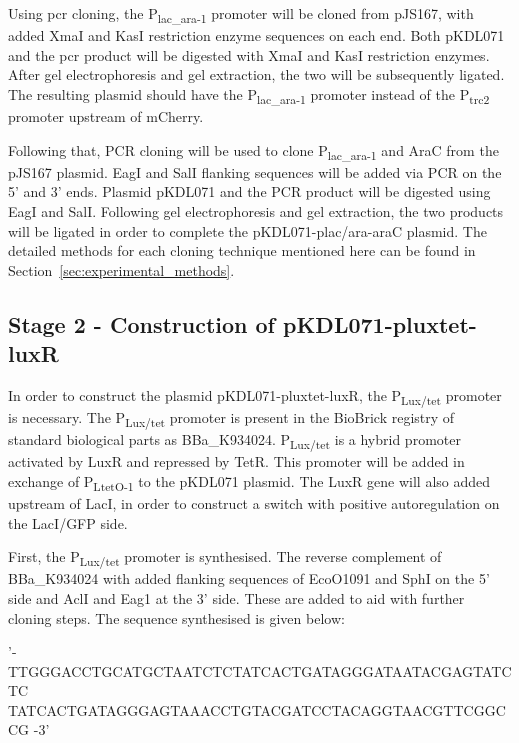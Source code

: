 Using \acrshort{pcr} cloning, the P\textsubscript{lac\_ara-1} promoter will be cloned from pJS167, with added XmaI and KasI  restriction enzyme sequences on each end. Both pKDL071 and the \acrshort{pcr} product will be digested with XmaI and KasI restriction enzymes. After gel electrophoresis and gel extraction, the two will be subsequently ligated. The resulting plasmid should have the P\textsubscript{lac\_ara-1} promoter instead of the P\textsubscript{trc2} promoter upstream of mCherry.


Following that, PCR cloning will be used to clone  P\textsubscript{lac\_ara-1} and AraC from the pJS167 plasmid. EagI and SalI flanking sequences will be added via PCR on the 5' and 3' ends. Plasmid pKDL071 and the PCR product will be digested using EagI and SalI. Following gel electrophoresis and gel extraction, the two products will be ligated in order to complete the pKDL071-plac/ara-araC plasmid. The detailed methods for each cloning technique mentioned here can be found in Section~\ref{sec:experimental_methods}.


\subsection{Stage 2 - Construction of pKDL071-pluxtet-luxR}
\label{sec:stage2}


In order to construct the plasmid pKDL071-pluxtet-luxR, the P\textsubscript{Lux/tet} promoter is necessary. The P\textsubscript{Lux/tet} promoter is present in the BioBrick registry of standard biological parts as BBa\_K934024. P\textsubscript{Lux/tet} is a hybrid promoter activated by LuxR and repressed by TetR. This promoter will be added in exchange of P\textsubscript{LtetO-1} to the pKDL071 plasmid. The LuxR gene will also added upstream of LacI, in order to construct a switch with positive autoregulation on the LacI/GFP side. 

First, the P\textsubscript{Lux/tet} promoter is synthesised. The reverse complement of BBa\_K934024 with added flanking sequences of EcoO1091 and SphI on the 5' side and AclI and Eag1 at the 3' side. These are added to aid with further cloning steps. The sequence synthesised is given below:

\vspace{3 mm}
'- TTGGGACCTGCATGCTAATCTCTATCACTGATAGGGATAATACGAGTATCTC\\TATCACTGATAGGGAGTAAACCTGTACGATCCTACAGGTAACGTTCGGCCG -3'
\vspace{3 mm}


